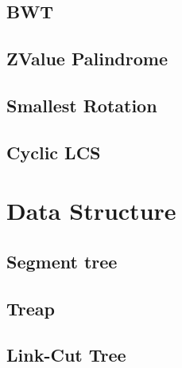 \documentclass[a4paper,10pt,twocolumn,oneside]{article}
\begin{document}
\subsection{BWT}


\subsection{ZValue Palindrome}


\subsection{Smallest Rotation}


%

\subsection{Cyclic LCS}


\section{Data Structure}

\subsection{Segment tree}


\subsection{Treap}


\subsection{Link-Cut Tree}


%
\end{document}

